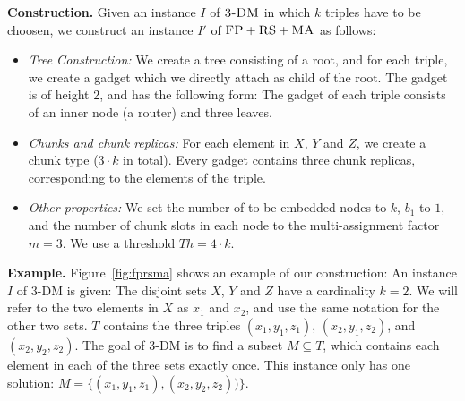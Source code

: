 \documentclass[9pt]{sigcomm-alternate}
\newcommand{\maciek}[1]{\textcolor{brown}{maciek: #1}}
\newcommand{\stefan}[1]{\textcolor{blue}{stefan: #1}}
\newcommand{\MaFactor}{m}
\newcommand{\FP}{\textsc{FP}}
\newcommand{\RS}{\textsc{RS}}
\newcommand{\MA}{\textsc{MA}}
\newcommand{\CostTrans}{\ensuremath{b_1}}
\newcommand{\TDM}{\textsc{3-DM}}
\newcommand{\Thr}{\ensuremath{Th}}
\begin{document}
\textbf{Construction.}
Given an instance $I$ of $\TDM$ in which $k$ triples have to be
choosen, we construct an instance $I'$ of
$\FP+\RS+\MA$ as follows:
\begin{itemize}
\item \emph{Tree Construction:} We create a tree consisting of a root,
and for each triple, we create a gadget which we directly attach as
child of the root. The gadget is of height 2,
and has the following form:
The gadget of each triple consists of an inner node (a router) and three leaves.
\item \emph{Chunks and chunk replicas:} For each element in $X$, $Y$ and $Z$,
 we create a chunk type
($3 \cdot k$ in total). Every gadget contains three chunk replicas,
corresponding to the elements of the triple.
\item \emph{Other properties:} We set the number of to-be-embedded nodes to $k$,
$\CostTrans$ to $1$, and the number of chunk slots in each node to the multi-assignment factor
$\MaFactor=3$.
We use a threshold $\Thr= 4
\cdot k$.
\end{itemize}

\textbf{Example.} Figure~\ref{fig:fprsma} shows an example of our construction: An
instance $I$ of 3-DM is given: The disjoint sets $X$, $Y$ and $Z$ have a
cardinality $k=2$. We will refer to the two elements in $X$ as $x_1$ and $x_2$,
and use the same notation for the other two sets. $T$ contains the three triples
$(x_1, y_1,
z_1)$, $(x_2, y_1, z_2)$, and $(x_2, y_2, z_2)$. The goal of 3-DM is to find a
subset $M \subseteq T$, which contains each element in each of the three sets
exactly once. This instance only has one solution: $M =
\{(x_1,y_1,z_1),(x_2,y_2,z_2))\}$.
\end{document}
